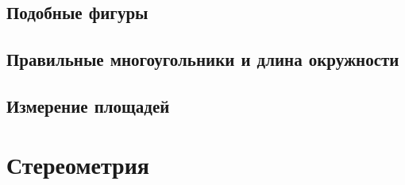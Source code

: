 \documentclass[twoside]{book}
\begin{document}
\chapter{Подобные фигуры}








\chapter[Правильные многоугольники]{Правильные многоугольники и длина окружности}



\chapter{Измерение площадей}




\part{Стереометрия}



{\scriptsize
\printindex
}



\tableofcontents

\end{document}
